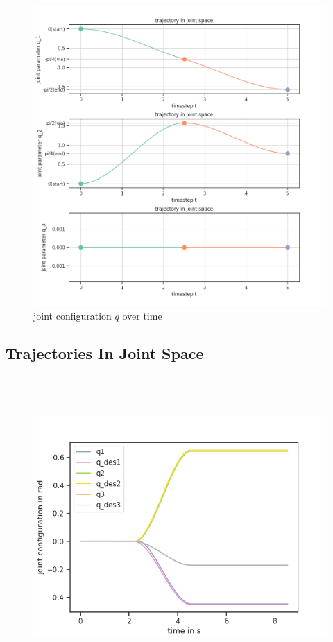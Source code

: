 \documentclass[a4paper,10pt]{article}
\begin{document}
\begin{figure}[H]
  \centering
  \includegraphics[scale=0.6]{../plots/B1(b)}
  \caption{joint configuration $q$ over time}
\end{figure}


\subsection{Trajectories In Joint Space}

\setcounter{subsection}{2}
\subsection{~}

\begin{figure}[H]
  \centering
  \includegraphics[scale=0.8]{img/B2_c_q}
\end{figure}
\end{document}
